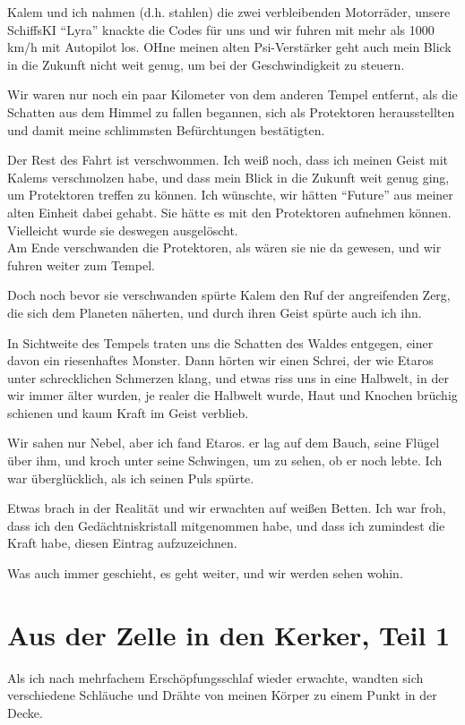\documentclass[11pt]{article}
\begin{document}
Kalem und ich nahmen (d.h. stahlen) die zwei verbleibenden Motorräder,
unsere SchiffsKI ``Lyra'' knackte die Codes für uns und wir fuhren mit
mehr als 1000 km/h mit Autopilot los. OHne meinen alten Psi-Verstärker
geht auch mein Blick in die Zukunft nicht weit genug, um bei der
Geschwindigkeit zu steuern.

Wir waren nur noch ein paar Kilometer von dem anderen Tempel entfernt,
als die Schatten aus dem Himmel zu fallen begannen, sich als Protektoren
herausstellten und damit meine schlimmsten Befürchtungen bestätigten.

Der Rest des Fahrt ist verschwommen. Ich weiß noch, dass ich meinen
Geist mit Kalems verschmolzen habe, und dass mein Blick in die Zukunft
weit genug ging, um Protektoren treffen zu können. Ich wünschte, wir
hätten ``Future'' aus meiner alten Einheit dabei gehabt. Sie hätte es
mit den Protektoren aufnehmen können. Vielleicht wurde sie deswegen
ausgelöscht.\\ Am Ende verschwanden die Protektoren, als wären sie nie
da gewesen, und wir fuhren weiter zum Tempel.

Doch noch bevor sie verschwanden spürte Kalem den Ruf der angreifenden
Zerg, die sich dem Planeten näherten, und durch ihren Geist spürte auch
ich ihn.

In Sichtweite des Tempels traten uns die Schatten des Waldes entgegen,
einer davon ein riesenhaftes Monster. Dann hörten wir einen Schrei, der
wie Etaros unter schrecklichen Schmerzen klang, und etwas riss uns in
eine Halbwelt, in der wir immer älter wurden, je realer die Halbwelt
wurde, Haut und Knochen brüchig schienen und kaum Kraft im Geist
verblieb.

Wir sahen nur Nebel, aber ich fand Etaros. er lag auf dem Bauch, seine
Flügel über ihm, und kroch unter seine Schwingen, um zu sehen, ob er
noch lebte. Ich war überglücklich, als ich seinen Puls spürte.

Etwas brach in der Realität und wir erwachten auf weißen Betten. Ich war
froh, dass ich den Gedächtniskristall mitgenommen habe, und dass ich
zumindest die Kraft habe, diesen Eintrag aufzuzeichnen.

Was auch immer geschieht, es geht weiter, und wir werden sehen wohin.

\section{Aus der Zelle in den Kerker, Teil 1}

Als ich nach mehrfachem Erschöpfungsschlaf wieder erwachte, wandten sich
verschiedene Schläuche und Drähte von meinen Körper zu einem Punkt in
der Decke.
\end{document}
